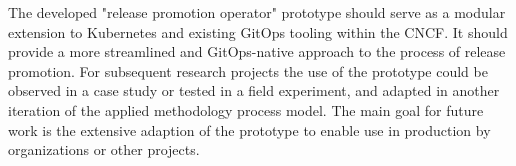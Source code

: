 \noindent
The developed "release promotion operator" prototype should serve as
a modular extension to Kubernetes and existing GitOps tooling within the CNCF.
It should provide a more streamlined and GitOps-native approach
to the process of release promotion.
For subsequent research projects the use of the prototype could
be observed in a case study or tested in a field experiment,
and adapted in another iteration of the applied methodology process model.
The main goal for future work is the extensive adaption of the prototype
to enable use in production by organizations or other projects.






























